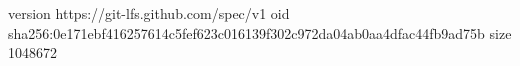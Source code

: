 version https://git-lfs.github.com/spec/v1
oid sha256:0e171ebf416257614c5fef623c016139f302c972da04ab0aa4dfac44fb9ad75b
size 1048672
